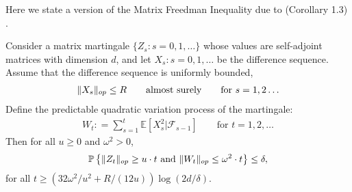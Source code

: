 Here we state a version of the Matrix Freedman Inequality due to \citep{tropp2011freedman} (Corollary 1.3) .
\begin{theorem}\label{thm:matrixfreedman} Consider a matrix martingale $\{Z_s:s = 0,1,\ldots\}$ whose values are self-adjoint matrices with dimension $d$, and let $X_s:s=0,1,\ldots$ be the difference sequence. Assume that the difference sequence is uniformly bounded,
\begin{align*}
    \lVert X_s\rVert_{op} \le R \qquad \text{almost surely} \qquad \text{for }s = 1,2\ldots
\end{align*}
Define the predictable quadratic variation process of the martingale:
\begin{align*}
    W_t: = \sum_{s=1}^t \mathbb{E}\left[X_s^2 \lvert \mathcal{F}_{s-1}\right] \qquad \text{for }t=1,2,\ldots
\end{align*}
Then for all $u\ge 0$ and $\omega^2 >0$,
\begin{align*}
    \mathbb{P}\left\{  \lVert Z_t\rVert_{op} \ge u\cdot t  \text{ and } \lVert W_t\rVert_{op} \le \omega^2\cdot t \right\} \le \delta,
\end{align*}
for all $t\ge \left( 32\omega^2/u^2 + R/(12u)\right)\log(2d/\delta)$.
\end{theorem}